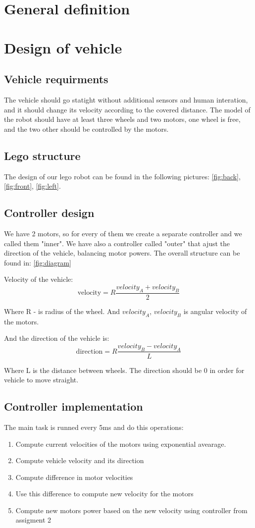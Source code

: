 \documentclass[a4paper,12pt,oneside]{article}
\begin{document}
\section{General definition}


\section{Design of vehicle}
\subsection{Vehicle requirments}
The vehicle should go statight without additional sensors and human interation, and it should change its velocity according to the covered distance. The model of the robot should have at least three wheels and two motors, one wheel is free, and the two other should be controlled by the motors. 
\subsection{Lego structure}
The design of our lego robot can be found in the following pictures: \cref{fig:back}, \cref{fig:front}, 
\cref{fig:left}.
\subsection{Controller design}
We have 2 motors, so for every of them we create a separate controller and we called them "inner". We have also a controller called "outer" that ajust the direction of the vehicle, balancing  motor powers. The overall structure can be found in: \cref{fig:diagram}

Velocity of the vehicle:
\begin{equation}
\text{velocity} = R \frac{velocity_A + velocity_B}{2} 
\end{equation}

Where R - is radius of the wheel. And $velocity_A$, $velocity_B$ is angular velocity of the motors. 

And the direction of the vehicle is:
\begin{equation}
\text{direction} = R \frac{velocity_B - velocity_A}{L}
\end{equation}

Where L is the distance between wheels. The direction should be 0 in order for vehicle to move straight.


\subsection{Controller implementation}
The main task is runned every 5ms and do this operations:
\begin{enumerate}
\item Compute current velocities of the motors using exponential avearage.
\item Compute vehicle velocity and its direction
\item Compute difference in motor velocities
\item Use this difference to compute new velocity for the motors
\item Compute new motors power based on the new velocity using controller from assigment 2
\end{enumerate}
\end{document}
